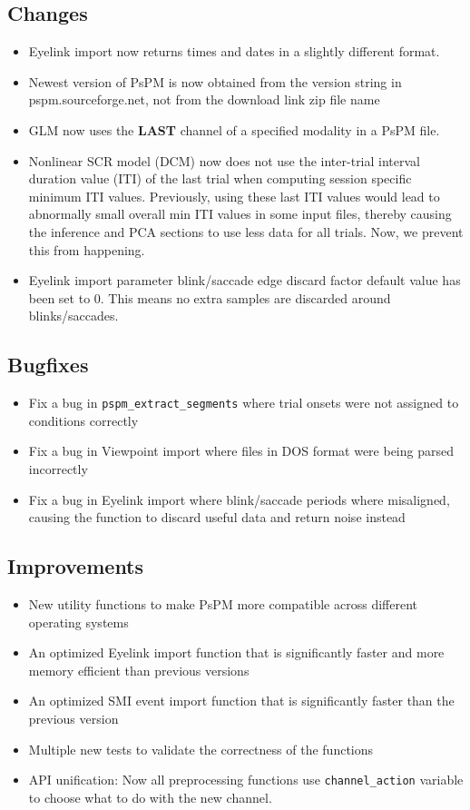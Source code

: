 \documentclass[english]{article}
\numberwithin{equation}{section}
\numberwithin{figure}{section}
\begin{document}
\subsection*{Changes}
\begin{itemize}
\item Eyelink import now returns times and dates in a slightly different
format.
\item Newest version of PsPM is now obtained from the version string in
pspm.sourceforge.net, not from the download link zip file name
\item GLM now uses the \textbf{LAST} channel of a specified modality in
a PsPM file.
\item Nonlinear SCR model (DCM) now does not use the inter-trial interval
duration value (ITI) of the last trial when computing session specific
minimum ITI values. Previously, using these last ITI values would
lead to abnormally small overall min ITI values in some input files,
thereby causing the inference and PCA sections to use less data for
all trials. Now, we prevent this from happening.
\item Eyelink import parameter blink/saccade edge discard factor default
value has been set to 0. This means no extra samples are discarded
around blinks/saccades.
\end{itemize}

\subsection*{Bugfixes}
\begin{itemize}
\item Fix a bug in \texttt{pspm\_extract\_segments} where trial onsets were
not assigned to conditions correctly
\item Fix a bug in Viewpoint import where files in DOS format were being
parsed incorrectly
\item Fix a bug in Eyelink import where blink/saccade periods where misaligned,
causing the function to discard useful data and return noise instead
\end{itemize}

\subsection*{Improvements}
\begin{itemize}
\item New utility functions to make PsPM more compatible across different
operating systems
\item An optimized Eyelink import function that is significantly faster
and more memory efficient than previous versions
\item An optimized SMI event import function that is significantly faster
than the previous version
\item Multiple new tests to validate the correctness of the functions
\item API unification: Now all preprocessing functions use \texttt{channel\_action}
variable to choose what to do with the new channel.
\end{itemize}
\end{document}
